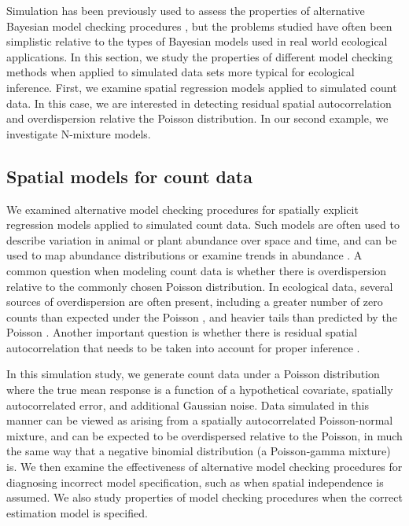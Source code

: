 \documentclass[12pt,english]{article}
\begin{document}
\begin{spacing}{1.9}
Simulation has been previously used to assess the properties of alternative Bayesian model checking procedures \citep[e.g.,][]{Gosselin2011,YuanJohnson2012,Zhang2014}, but the problems studied have often been simplistic relative to the types of Bayesian models used in real world ecological applications.  In this section, we study the properties of different model checking methods when applied to simulated data sets more typical for ecological inference.
First, we examine spatial regression models applied to simulated count data.  In this case, we are interested in detecting residual spatial autocorrelation and overdispersion relative the Poisson distribution.  In our second example, we investigate N-mixture models.

\subsection{Spatial models for count data}

We examined alternative model checking procedures for spatially explicit regression models applied to simulated count data.  Such models are often used to describe variation in animal or plant abundance over space and time, and can be used to map abundance distributions or examine trends in abundance \citep[e.g.,][]{SauerLink2011,ConnEtAl2014}.  A common question when modeling count data is whether there is overdispersion relative to the commonly chosen Poisson distribution.  In ecological data, several sources of overdispersion are often present, including a greater number of zero counts than expected under the Poisson \citep[zero inflation;][]{AgarwalEtAl2002}, and heavier tails than predicted by the Poisson \citep{PottsElith2006,VerHoefBoveng2007}.  Another important question is whether there is residual spatial autocorrelation that needs to be taken into account for proper inference \citep{Legendre1993,LichsteinEtAl2002}.

In this simulation study, we generate count data under a Poisson distribution where the true mean response is a function of a hypothetical covariate, spatially autocorrelated error, and additional Gaussian noise.  Data simulated in this manner can be viewed as arising from a spatially autocorrelated Poisson-normal mixture, and can be expected to be overdispersed relative to the Poisson, in much the same way that a negative binomial distribution (a Poisson-gamma mixture) is.  We then examine the effectiveness of alternative model checking procedures for diagnosing incorrect model specification, such as when spatial independence is assumed.  We also study properties of model checking procedures when the correct estimation model is specified.


\end{spacing}
\end{document}
